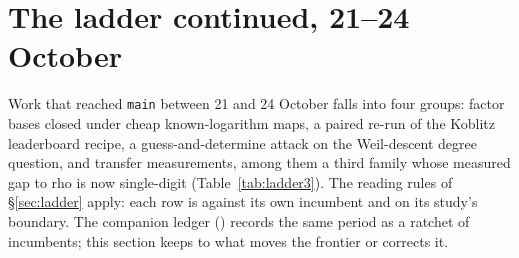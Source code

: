 \section{The ladder continued, 21--24 October}\label{sec:ladder3}

Work that reached \texttt{main} between 21 and 24 October falls into four
groups: factor bases closed under cheap known-logarithm maps, a paired
re-run of the Koblitz leaderboard recipe, a guess-and-determine attack on
the Weil-descent degree question, and transfer measurements, among them a
third family whose measured gap to rho is now single-digit
(Table~\ref{tab:ladder3}). The reading rules of \S\ref{sec:ladder} apply:
each row is against its own incumbent and on its study's boundary. The
companion ledger () records the
same period as a ratchet of incumbents; this section keeps to what moves
the frontier or corrects it.

